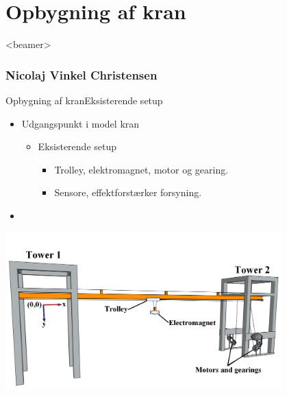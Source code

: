 \section{Opbygning af kran}
 \begin{frame}<beamer>
 \frametitle{Nicolaj Vinkel Christensen}
 \tableofcontents[currentsection]
 \end{frame}
\begin{frame}{Opbygning af kran}{Eksisterende setup}


 \begin{minipage}[H]{0.8\linewidth}
  \begin{itemize}
    \item<1-> Udgangspunkt i model kran 
        \begin{itemize}
          \item<1-> Eksisterende setup
              \begin{itemize}
              \item<1-> Trolley, elektromagnet, motor og gearing. 
              \item<1-> Sensore, effektforstærker forsyning. 
              \end{itemize}
        \end{itemize}
  \end{itemize}
  \end{minipage}
  \begin{minipage}[H]{0.6\linewidth}
    \begin{itemize}
      \item<1->[] {
              }
    \end{itemize}                   
  \end{minipage}
    \begin{center}
              \includegraphics[width=0.8\textwidth]{Billeder/FullCrane}
    \end{center}
 \end{frame}

